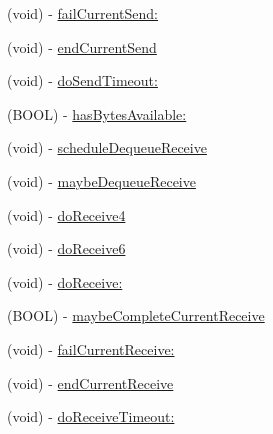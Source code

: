 \begin{DoxyCompactItemize}
(void) -\/ \hyperlink{interface_async_udp_socket_a8da059627d826ea2bf527096304ebb97}{failCurrentSend:}
\item 
(void) -\/ \hyperlink{interface_async_udp_socket_af644a19a3ada970e76ebb2451a2bc00d}{endCurrentSend}
\item 
(void) -\/ \hyperlink{interface_async_udp_socket_ad2a089e3c6f01cfea86dfa3fbd39f27f}{doSendTimeout:}
\item 
(BOOL) -\/ \hyperlink{interface_async_udp_socket_a027d263e67689afdefcfdce2846b3091}{hasBytesAvailable:}
\item 
(void) -\/ \hyperlink{interface_async_udp_socket_a676257c22febef76652df19b220cdb6f}{scheduleDequeueReceive}
\item 
(void) -\/ \hyperlink{interface_async_udp_socket_a05eb56d20476ea9a21d8e51970c60613}{maybeDequeueReceive}
\item 
(void) -\/ \hyperlink{interface_async_udp_socket_afde86a47a47167400719467c9ca7ccc5}{doReceive4}
\item 
(void) -\/ \hyperlink{interface_async_udp_socket_a81a86905a9adf8afc7cf903023f9d117}{doReceive6}
\item 
(void) -\/ \hyperlink{interface_async_udp_socket_aeb6350818913b8c48bcc338f0ed0b364}{doReceive:}
\item 
(BOOL) -\/ \hyperlink{interface_async_udp_socket_ac261fa9d220841c06d37b19473d5fb35}{maybeCompleteCurrentReceive}
\item 
(void) -\/ \hyperlink{interface_async_udp_socket_a65f514527cc0537db7cdd21be43a9036}{failCurrentReceive:}
\item 
(void) -\/ \hyperlink{interface_async_udp_socket_a386cd56f00840515fd305c23c8b00df2}{endCurrentReceive}
\item 
(void) -\/ \hyperlink{interface_async_udp_socket_a7426165a4995daf979894211876b3e3f}{doReceiveTimeout:}
\end{DoxyCompactItemize}

